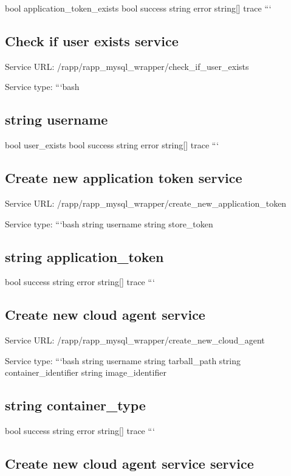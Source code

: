 bool application\-\_\-token\-\_\-exists bool success string error string\mbox{[}\mbox{]} trace ```

\subsection*{Check if user exists service}

Service U\-R\-L\-: {\ttfamily /rapp/rapp\-\_\-mysql\-\_\-wrapper/check\-\_\-if\-\_\-user\-\_\-exists}

Service type\-: ```bash \subsection*{string username }

bool user\-\_\-exists bool success string error string\mbox{[}\mbox{]} trace ```

\subsection*{Create new application token service}

Service U\-R\-L\-: {\ttfamily /rapp/rapp\-\_\-mysql\-\_\-wrapper/create\-\_\-new\-\_\-application\-\_\-token}

Service type\-: ```bash string username string store\-\_\-token \subsection*{string application\-\_\-token }

bool success string error string\mbox{[}\mbox{]} trace ```

\subsection*{Create new cloud agent service}

Service U\-R\-L\-: {\ttfamily /rapp/rapp\-\_\-mysql\-\_\-wrapper/create\-\_\-new\-\_\-cloud\-\_\-agent}

Service type\-: ```bash string username string tarball\-\_\-path string container\-\_\-identifier string image\-\_\-identifier \subsection*{string container\-\_\-type }

bool success string error string\mbox{[}\mbox{]} trace ```

\subsection*{Create new cloud agent service service}


